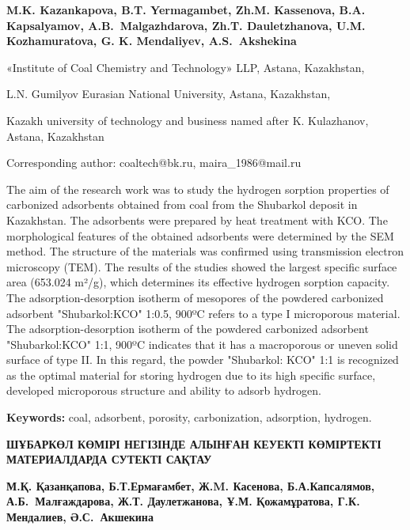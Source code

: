 
\begin{header}

{\bfseries
{}M.K. Kazankapova\envelope,
B.T. Yermagambet,
Zh.M. Kassenova,
B.A. Kapsalyamov,
A.B.~Malgazhdarova,
Zh.T. Dauletzhanova,
U.M. Kozhamuratova,
G. K. Mendaliyev,
A.S.~Akshekina
}
\end{header}

\begin{affil}
«Institute of Coal Chemistry and Technology» LLP, Astana, Kazakhstan,

L.N. Gumilyov Eurasian National University, Astana, Kazakhstan,

Kazakh university of technology and business named after K. Kulazhanov, Astana, Kazakhstan

\envelope Corresponding author: coaltech@bk.ru, maira\_1986@mail.ru
\end{affil}

The aim of the research work was to study the hydrogen sorption
properties of carbonized adsorbents obtained from coal from the
Shubarkol deposit in Kazakhstan. The adsorbents were prepared by heat
treatment with KCO. The morphological
features of the obtained adsorbents were determined by the SEM method.
The structure of the materials was confirmed using transmission electron
microscopy (TEM). The results of the studies showed the largest specific
surface area (653.024 m²/g), which determines its effective hydrogen
sorption capacity. The adsorption-desorption isotherm of mesopores of
the powdered carbonized adsorbent
"Shubarkol:KCO" 1:0.5, 900ºC refers to
a type I microporous material. The adsorption-desorption isotherm of the
powdered carbonized adsorbent
"Shubarkol:KCO" 1:1, 900ºC indicates
that it has a macroporous or uneven solid surface of type II. In this
regard, the powder "Shubarkol: KCO" 1:1
is recognized as the optimal material for storing hydrogen due to its
high specific surface, developed microporous structure and ability to
adsorb hydrogen.

{\bfseries Keywords:} coal, adsorbent, porosity, carbonization, adsorption,
hydrogen.

\begin{header}
{\bfseries ШҰБАРКӨЛ КӨМІРІ НЕГІЗІНДЕ АЛЫНҒАН КЕУЕКТІ КӨМІРТЕКТІ
МАТЕРИАЛДАРДА СУТЕКТІ САҚТАУ}

{\bfseries
{}М.Қ. Қазанқапова\envelope,
Б.Т.Ермағамбет,
Ж.M. Касенова,
Б.А.Капсалямов,
А.Б.~Малғаждарова,
Ж.Т. Даулетжанова,
Ұ.М. Қожамұратова,
Г.К. Мендалиев,
Ә.С.~Акшекина
}
\end{header}

